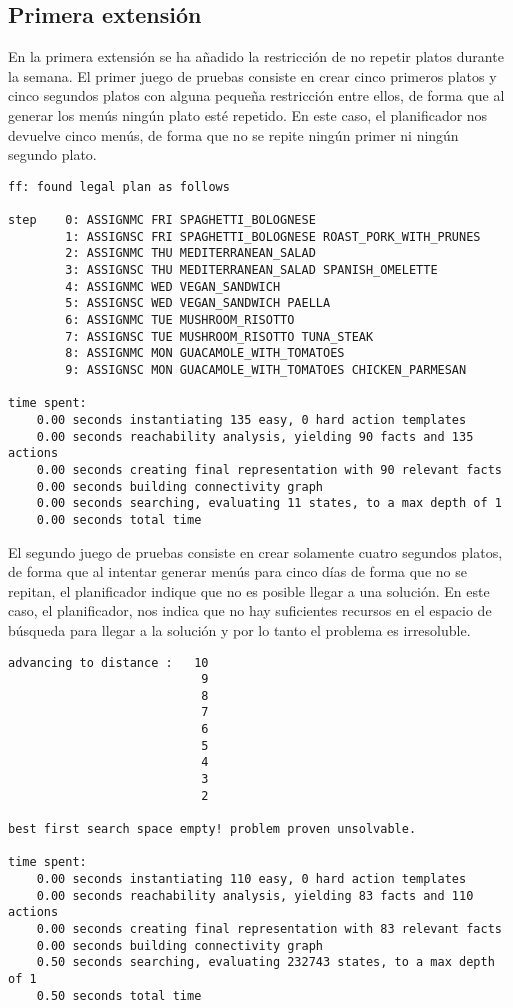 \documentclass{article}
\begin{document}
\subsection{Primera extensión}
En la primera extensión se ha añadido la restricción de no repetir platos durante la semana. El primer juego de pruebas consiste en crear cinco primeros platos y cinco segundos platos con alguna pequeña restricción entre ellos, de forma que al generar los menús ningún plato esté repetido. En este caso, el planificador nos devuelve cinco menús, de forma que no se repite ningún primer ni ningún segundo plato.
\begin{lstlisting}[language=none]
ff: found legal plan as follows

step    0: ASSIGNMC FRI SPAGHETTI_BOLOGNESE
        1: ASSIGNSC FRI SPAGHETTI_BOLOGNESE ROAST_PORK_WITH_PRUNES
        2: ASSIGNMC THU MEDITERRANEAN_SALAD
        3: ASSIGNSC THU MEDITERRANEAN_SALAD SPANISH_OMELETTE
        4: ASSIGNMC WED VEGAN_SANDWICH
        5: ASSIGNSC WED VEGAN_SANDWICH PAELLA
        6: ASSIGNMC TUE MUSHROOM_RISOTTO
        7: ASSIGNSC TUE MUSHROOM_RISOTTO TUNA_STEAK
        8: ASSIGNMC MON GUACAMOLE_WITH_TOMATOES
        9: ASSIGNSC MON GUACAMOLE_WITH_TOMATOES CHICKEN_PARMESAN

time spent:
    0.00 seconds instantiating 135 easy, 0 hard action templates
    0.00 seconds reachability analysis, yielding 90 facts and 135 actions
    0.00 seconds creating final representation with 90 relevant facts
    0.00 seconds building connectivity graph
    0.00 seconds searching, evaluating 11 states, to a max depth of 1
    0.00 seconds total time
\end{lstlisting}
El segundo juego de pruebas consiste en crear solamente cuatro segundos platos, de forma que al intentar generar menús para cinco días de forma que no se repitan, el planificador indique que no es posible llegar a una solución. En este caso, el planificador, nos indica que no hay suficientes recursos en el espacio de búsqueda para llegar a la solución y por lo tanto el problema es irresoluble.
\begin{lstlisting}[language=none]
advancing to distance :   10
                           9
                           8
                           7
                           6
                           5
                           4
                           3
                           2

best first search space empty! problem proven unsolvable.

time spent:
    0.00 seconds instantiating 110 easy, 0 hard action templates
    0.00 seconds reachability analysis, yielding 83 facts and 110 actions
    0.00 seconds creating final representation with 83 relevant facts
    0.00 seconds building connectivity graph
    0.50 seconds searching, evaluating 232743 states, to a max depth of 1
    0.50 seconds total time
\end{lstlisting}
\end{document}
